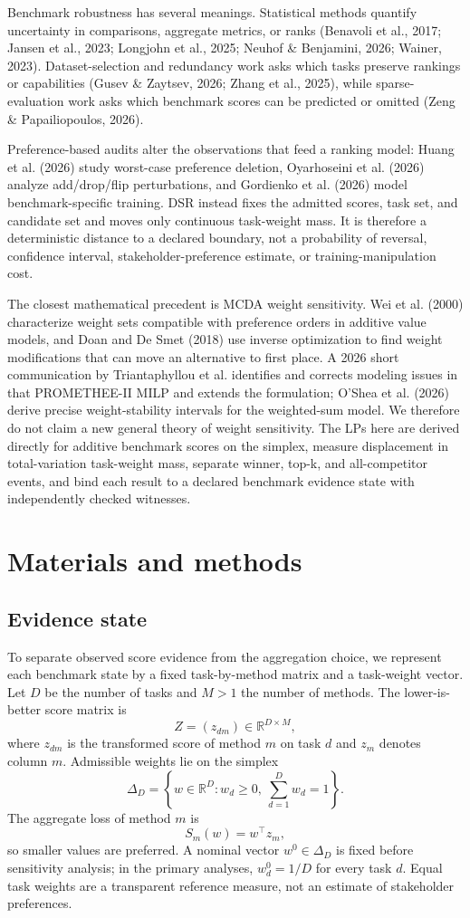 \documentclass[11pt]{article}
\begin{document}
Benchmark robustness has several meanings. Statistical methods quantify uncertainty in comparisons, aggregate metrics, or ranks (Benavoli et al., 2017; Jansen et al., 2023; Longjohn et al., 2025; Neuhof \& Benjamini, 2026; Wainer, 2023). Dataset-selection and redundancy work asks which tasks preserve rankings or capabilities (Gusev \& Zaytsev, 2026; Zhang et al., 2025), while sparse-evaluation work asks which benchmark scores can be predicted or omitted (Zeng \& Papailiopoulos, 2026).

Preference-based audits alter the observations that feed a ranking model: Huang et al. (2026) study worst-case preference deletion, Oyarhoseini et al. (2026) analyze add/drop/flip perturbations, and Gordienko et al. (2026) model benchmark-specific training. DSR instead fixes the admitted scores, task set, and candidate set and moves only continuous task-weight mass. It is therefore a deterministic distance to a declared boundary, not a probability of reversal, confidence interval, stakeholder-preference estimate, or training-manipulation cost.

The closest mathematical precedent is MCDA weight sensitivity. Wei et al. (2000) characterize weight sets compatible with preference orders in additive value models, and Doan and De Smet (2018) use inverse optimization to find weight modifications that can move an alternative to first place. A 2026 short communication by Triantaphyllou et al. identifies and corrects modeling issues in that PROMETHEE-II MILP and extends the formulation; O’Shea et al. (2026) derive precise weight-stability intervals for the weighted-sum model. We therefore do not claim a new general theory of weight sensitivity. The LPs here are derived directly for additive benchmark scores on the simplex, measure displacement in total-variation task-weight mass, separate winner, top-k, and all-competitor events, and bind each result to a declared benchmark evidence state with independently checked witnesses.

\section{Materials and methods}

\subsection{Evidence state}

To separate observed score evidence from the aggregation choice, we represent each benchmark state by a fixed task-by-method matrix and a task-weight vector. Let $D$ be the number of tasks and $M>1$ the number of methods. The lower-is-better score matrix is
\[
Z=(z_{dm})\in\mathbb{R}^{D\times M},
\]
where $z_{dm}$ is the transformed score of method $m$ on task $d$ and $z_m$ denotes column $m$. Admissible weights lie on the simplex
\[
\Delta_D=\left\{w\in\mathbb{R}^D:w_d\ge0,\ \sum_{d=1}^{D}w_d=1\right\}.
\]
The aggregate loss of method $m$ is
\[
S_m(w)=w^\top z_m,
\]
so smaller values are preferred. A nominal vector $w^0\in\Delta_D$ is fixed before sensitivity analysis; in the primary analyses, $w_d^0=1/D$ for every task $d$. Equal task weights are a transparent reference measure, not an estimate of stakeholder preferences.
\end{document}
